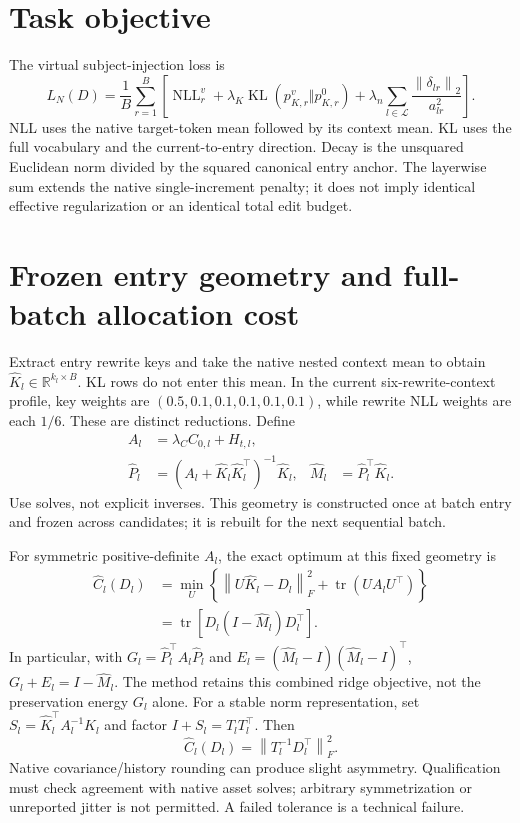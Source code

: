 \documentclass[11pt]{article}
\newcommand{\tr}{\operatorname{tr}}
\newcommand{\KL}{\operatorname{KL}}
\newcommand{\NLL}{\operatorname{NLL}}
\newcommand{\norm}[1]{\left\lVert #1\right\rVert}
\begin{document}
\section{Task objective}
The virtual subject-injection loss is
\begin{equation}
 L_N(D)=\frac1B\sum_{r=1}^{B}\left[
 \NLL_r^v+\lambda_K\KL(p^v_{K,r}\Vert p^0_{K,r})
 +\lambda_n\sum_{l\in\mathcal L}
       \frac{\norm{\delta_{lr}}_2}{a_{lr}^2}\right].
 \label{eq:native}
\end{equation}
NLL uses the native target-token mean followed by its context mean. KL uses the
full vocabulary and the current-to-entry direction. Decay is the unsquared
Euclidean norm divided by the squared canonical entry anchor. The layerwise
sum extends the native single-increment penalty; it does not imply identical
effective regularization or an identical total edit budget.

\section{Frozen entry geometry and full-batch allocation cost}
Extract entry rewrite keys and take the native nested context mean to obtain
$\widehat K_l\in\mathbb R^{k_l\times B}$. KL rows do not enter this mean.
In the current six-rewrite-context profile, key weights are
$(0.5,0.1,0.1,0.1,0.1,0.1)$, while rewrite NLL weights are each $1/6$.
These are distinct reductions. Define
\begin{align}
 A_l&=\lambda_C C_{0,l}+H_{t,l},\\
 \widehat P_l&=(A_l+\widehat K_l\widehat K_l^\top)^{-1}\widehat K_l,
 &\widehat M_l&=\widehat P_l^\top\widehat K_l.
\end{align}
Use solves, not explicit inverses. This geometry is constructed once at batch
entry and frozen across candidates; it is rebuilt for the next sequential batch.

For symmetric positive-definite $A_l$, the exact optimum at this fixed geometry is
\begin{align}
 \widehat C_l(D_l)
 &=\min_U\left\{\norm{U\widehat K_l-D_l}_F^2+
                         \tr(U A_lU^\top)\right\}\\
 &=\tr\left[D_l(I-\widehat M_l)D_l^\top\right].
 \label{eq:ridgecost}
\end{align}
In particular, with
$G_l=\widehat P_l^\top A_l\widehat P_l$ and
$E_l=(\widehat M_l-I)(\widehat M_l-I)^\top$,
$G_l+E_l=I-\widehat M_l$. The method retains this combined ridge objective,
not the preservation energy $G_l$ alone. For a stable norm representation, set
$S_l=\widehat K_l^\top A_l^{-1}\widehat K_l$ and factor
$I+S_l=T_lT_l^\top$. Then
\begin{equation}
 \widehat C_l(D_l)=\norm{T_l^{-1}D_l^\top}_F^2.
\end{equation}
Native covariance/history rounding can produce slight asymmetry. Qualification
must check agreement with native asset solves; arbitrary symmetrization or
unreported jitter is not permitted. A failed tolerance is a technical failure.
\end{document}
